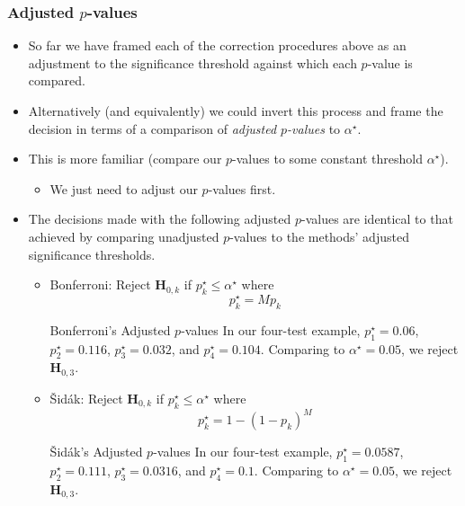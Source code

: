 \subsubsection*{Adjusted $ p $-values}
\begin{itemize}
      \item So far we have framed each of the correction procedures above as an adjustment to the significance
            threshold against which each $p$-value is compared.
      \item Alternatively (and equivalently) we could invert this process and frame the decision in terms of a
            comparison of \emph{adjusted $p$-values} to $ \alpha^\star $.
      \item This is more familiar (compare our $ p $-values to some constant threshold $ \alpha^\star $).
            \begin{itemize}
                  \item We just need to adjust our $p$-values first.
            \end{itemize}
      \item The decisions made with the following adjusted $p$-values are identical to that achieved by comparing
            unadjusted $p$-values to the methods' adjusted significance thresholds.
            \begin{itemize}
                  \item Bonferroni: Reject $ \mathbf{H}_{0,k} $ if $ p_k^\star\le \alpha^\star $ where
                        \[ p_k^\star=Mp_k \]
                        \begin{Example}{Bonferroni's Adjusted $ p $-values}{}
                              In our four-test example, $ p_1^\star=0.06 $, $ p_2^\star=0.116 $, $ p_3^\star=0.032 $, and $ p_4^\star=0.104 $.
                              Comparing to $ \alpha^\star=0.05 $, we reject $ \mathbf{H}_{0,3} $.
                        \end{Example}
                  \item Šidák: Reject $ \mathbf{H}_{0,k} $ if $ p_k^\star\le \alpha^\star $ where
                        \[ p_k^\star=1-(1-p_k)^M \]
                        \begin{Example}{Šidák's Adjusted $ p $-values}{}
                              In our four-test example, $ p_1^\star=0.0587 $, $ p_2^\star=0.111 $, $ p_3^\star=0.0316 $, and $ p_4^\star=0.1 $.
                              Comparing to $ \alpha^\star=0.05 $, we reject $ \mathbf{H}_{0,3} $.
                        \end{Example}

\end{itemize}
\end{itemize}
